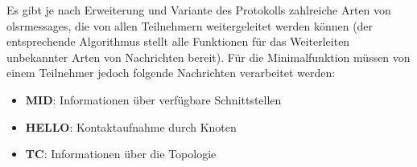 
Es gibt je nach Erweiterung und Variante des Protokolls zahlreiche Arten von \glspl{olsrmessage}, die von allen Teilnehmern weitergeleitet werden können (der entsprechende Algorithmus stellt alle Funktionen für das Weiterleiten unbekannter Arten von Nachrichten bereit). Für die Minimalfunktion müssen von einem Teilnehmer jedoch folgende Nachrichten verarbeitet werden:

\begin{itemize}
\item \textbf{MID}: Informationen über verfügbare Schnittstellen
\item \textbf{HELLO}: Kontaktaufnahme durch Knoten
\item \textbf{TC}: Informationen über die Topologie
\end{itemize}

